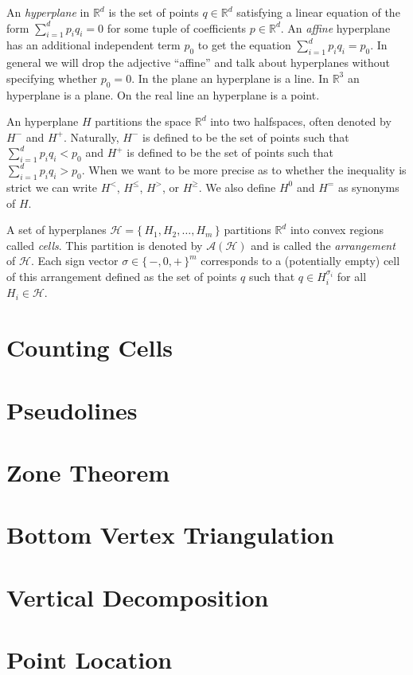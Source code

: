 An \emph{hyperplane} in \(\mathbb{R}^d\) is the set of points \(q \in \mathbb{R}^d\)
satisfying a linear equation of the form \(\sum_{i=1}^{d} p_i q_i = 0\) for
some tuple of coefficients \(p \in \mathbb{R}^d\). An \emph{affine} hyperplane has an
additional independent term \(p_0\) to get the equation \(\sum_{i=1}^{d}
p_i q_i = p_0\). In general we will drop the adjective ``affine'' and talk about
hyperplanes without specifying whether \(p_0 = 0\).
%
In the plane an hyperplane is a line. In \(\mathbb{R}^3\) an hyperplane is
a plane. On the real line an hyperplane is a point.

An hyperplane \(H\) partitions the space \(\mathbb{R}^d\) into two halfspaces,
often denoted by \(H^-\) and \(H^+\).
Naturally, \(H^-\) is defined to be the set of points such that
\(\sum_{i=1}^{d} p_i q_i < p_0 \) and \(H^+\) is defined to be the set of
points such that \(\sum_{i=1}^{d} p_i q_i > p_0 \). When we want to be more
precise as to whether the inequality is strict we can write \(H^{<}\),
\(H^{\leq}\), \(H^{>}\), or \(H^{\geq}\).
We also define \(H^0\) and \(H^{=}\) as synonyms of \(H\).

A set of hyperplanes \(\mathcal{H} = \{\, H_1, H_2, \ldots, H_m\,\}\)
partitions \(\mathbb{R}^d\) into convex regions called \emph{cells}.
%
This partition is denoted by \(\mathcal{A}(\mathcal{H})\) and is called the
\emph{arrangement} of \(\mathcal{H}\).
%
Each sign vector \(\sigma \in {\{\,-,0,+\,\}}^{m}\) corresponds to a
(potentially empty) cell of this arrangement defined as the set of points \(q\)
such that \(q \in H_i^{\sigma_i}\) for all \(H_i \in \mathcal{H}\).

\section{Counting Cells}


\section{Pseudolines}


\section{Zone Theorem}



\section{Bottom Vertex Triangulation}


\section{Vertical Decomposition}


\section{Point Location}

